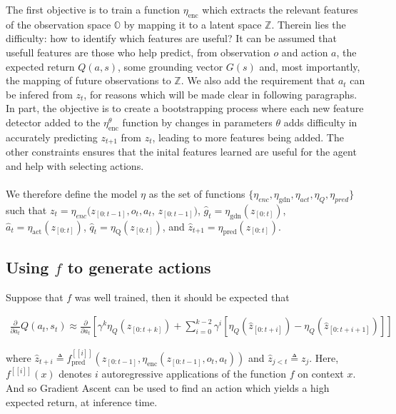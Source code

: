 \documentclass[]{article}
\begin{document}
The first objective is to train a function $\eta_{\text{enc}}$ which extracts the relevant features of the observation space $\mathbb{O}$ by mapping it to a latent space $\mathbb{Z}$. Therein lies the difficulty: how to identify which features are useful?
It can be assumed that usefull features are those who help predict, from observation $o$ and action $a$, the expected return $Q(a, s)$, some grounding vector $G(s)$ and, most importantly, the mapping of future observations to $\mathbb{Z}$. We also add the requirement that $a_t$ can be infered from $z_t$, for reasons which will be made clear in following paragraphs. In part, the objective is to create a bootstrapping process where each new feature detector added to the $\eta_\text{enc}^\theta$ function by changes in parameters $\theta$ adds difficulty in accurately predicting $z_{t \boldsymbol{+}1}$ from $z_t$, leading to more features being added. The other constraints ensures that the inital features learned are useful for the agent and help with selecting actions.
\\ \\ 
We therefore define the model $\eta$ as the set of functions $\{\eta_{enc}, \eta_{\text{gdn}}, \eta_{act}, \eta_{Q}, \eta_{pred}\}$ such that $z_t = \eta_{enc}(z_{[0:t-1]}, o_t, a_t$, $z_{[0:t-1]})$, $\hat{g}_t = \eta_{\text{gdn}}(z_{[0:t]})$, $\hat{a}_t = \eta_{\text{act}}(z_{[0:t]})$, $\hat{q}_t = \eta_{\text{Q}}(z_{[0:t]})$, and $\hat{z}_{t \boldsymbol{+}1} = \eta_{\text{pred}}(z_{[0:t]})$. 



\subsection{Using $f$ to generate actions}

Suppose that $f$ was well trained, then it should be expected that


\begin{align}
\frac{\partial}{\partial a_t}Q(a_t, s_t)
\approx
\frac{\partial}{\partial a_t} \left[ 
	\gamma^{k}\eta_{Q}(\hat{z}_{[0:t+k]}) + \sum_{i=0}^{k-2} \gamma^{i}\left[\eta_{Q}(\hat{z}_{[0:t+i]}) -\eta_{Q}(\hat{z}_{[0:t+i+1]})\right]
\right]
\end{align}


where 
$
\hat{z}_{t+i} \triangleq f^{[[i]] }_{\text{pred}}(z_{[0:t-1]}, \eta_{\text{enc}}(z_{[0:t-1]}, o_t, a_t)) 
$
and
$
\hat{z}_{j<t} \triangleq z_j
$. Here, $f^{[[i]]}(x)$ denotes $i$ autoregressive applications of the function $f$ on context $x$. And so Gradient Ascent can be used to find an action which yields a high expected return, at inference time.
\end{document}
